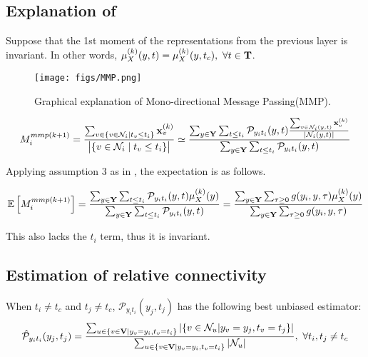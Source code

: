 \subsection{Explanation of \MMP}
\label{apdx:MMP}
Suppose that the 1st moment of the representations from the previous layer is invariant. In other words, $\mu_{X}^{(k)}(y,t)=\mu_{X}^{(k)}(y,t_{c}),\ \forall t\in\bold{T}$.

\begin{figure}[hbt!]
	\vspace{0.15in}
	\centering
	\texttt{[image: figs/MMP.png]}
	\vspace{-0.1in}
	\caption{Graphical explanation of Mono-directional Message Passing(MMP).}
	 \label{fig:MMP}
	 \vspace{0.5in}
\end{figure}

\begin{align}
M_{i}^{mmp(k+1)} = {{\sum_{v\in \{v\in \mathcal{N}_i \mid t_v \le t_i \}} \bold{x}_{v}^{(k)}}\over{\big|\{v\in \mathcal{N}_i \mid t_v \le t_i \}\big| }} \simeq {\sum_{y\in \bold{Y}}\sum_{t\le t_i}{\mathcal{P}_{y_i t_i}(y,t)}{\sum_{v\in \mathcal{N}_{i}(y, t) }\bold{x}_v^{(k)} \over |\mathcal{N}_i(y,t)|}\over \sum_{y\in \bold{Y}}\sum_{t\le t_i}{\mathcal{P}_{y_i t_i}(y,t)}}
\end{align}


Applying assumption 3 as in \PMP, the expectation is as follows.

\begin{align}
\mathbb E\left[{M_{ i}^{mmp(k+1)}}\right] = {\sum_{y\in \bold{Y}}\sum_{t\le t_i }\mathcal{P}_{y_i t_i}(y, t) \mu_{X}^{(k)}(y)\over \sum_{y\in \bold{Y}}\sum_{t\le t_i }\mathcal{P}_{y_i t_i}(y, t)}={\sum_{y\in \bold{Y}}\sum_{\tau\ge 0}g(y_i, y,\tau) \mu_{X}^{(k)}(y)\over \sum_{y\in \bold{Y}}\sum_{\tau\ge 0}g(y_i, y,\tau)}
\end{align}


This also lacks the $t_i$ term, thus it is invariant.








\subsection{Estimation of relative connectivity}
\label{apdx:rel_con}

When $t_i \neq t_{c}$ and $t_j \neq t_{c}$, $\mathcal{P}_{y_i t_i} (y_j ,t_j)$ has the following best unbiased estimator:
\begin{align}
\hat{\mathcal{P}}_{y_i t_i} (y_j ,t_j)={\sum_{u\in \{v\in \bold{V} | y_v=y_i, t_v=t_i\}}|\{v\in \mathcal{N}_u | y_v=y_j, t_v=t_j\}|\over \sum _{u\in \{v\in \bold{V} | y_v=y_i, t_v=t_i\}}|\mathcal{N}_u|} , \ \forall t_i, t_j \neq t_{c}
\end{align}


